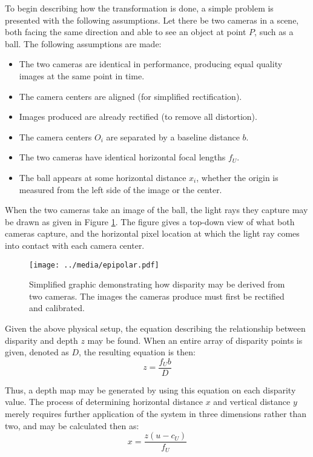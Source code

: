 To begin describing how the transformation is done, a simple problem is presented with the following assumptions. Let there be two cameras in a scene, both facing the same direction and able to see an object at point $P$, such as a ball. The following assumptions are made: 

\begin{itemize} \itemsep=-0.5em
	\item The two cameras are identical in performance, producing equal quality images at the same point in time.
	\item The camera centers are aligned (for simplified rectification).
	\item Images produced are already rectified (to remove all distortion).
	\item The camera centers $O_i$ are separated by a baseline distance $b$.
	\item The two cameras have identical horizontal focal lengths $f_U$.
	\item The ball appears at some horizontal distance $x_i$, whether the origin is measured from the left side of the image or the center.
\end{itemize}

When the two cameras take an image of the ball, the light rays they capture may be drawn as given in Figure \ref{epipolar}. The figure gives a top-down view of what both cameras capture, and the horizontal pixel location at which the light ray comes into contact with each camera center. 

\begin{figure}[ht]
    \centering
	\texttt{[image: ../media/epipolar.pdf]}
	\caption{Simplified graphic demonstrating how disparity may be derived from two cameras. The images the cameras produce must first be rectified and calibrated.}
	\label{epipolar}
\end{figure}

Given the above physical setup, the equation describing the relationship between disparity and depth $z$ may be found. When an entire array of disparity points is given, denoted as $D$, the resulting equation is then: 
\begin{equation}
z = \frac{f_U b}{D}
\label{eq_epi_z}
\end{equation}

Thus, a depth map may be generated by using this equation on each disparity value. The process of determining horizontal distance $x$ and vertical distance $y$ merely requires further application of the system in three dimensions rather than two, and may be calculated then as: 
\begin{equation}
x = \frac{z (u - c_U)}{f_U}
\end{equation}

